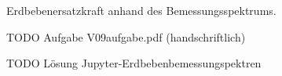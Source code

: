 Erdbebenersatzkraft anhand des Bemessungsspektrums.

\smallskip

TODO Aufgabe V09aufgabe.pdf (handschriftlich)

\smallskip

TODO Lösung Jupyter-Erdbebenbemessungspektren
